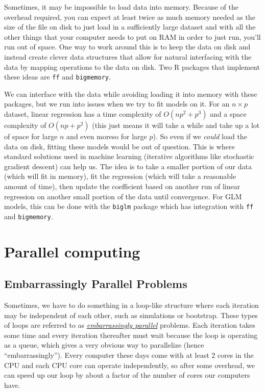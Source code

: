 \documentclass[
]{book}
\begin{document}
Sometimes, it may be impossible to load data into memory. Because of the overhead required, you can expect at least twice as much memory needed as the size of the file on disk to just load in a sufficiently large dataset and with all the other things that your computer needs to put on RAM in order to just run, you'll run out of space. One way to work around this is to keep the data on disk and instead create clever data structures that allow for natural interfacing with the data by mapping operations to the data on disk. Two R packages that implement these ideas are \texttt{ff} and \texttt{bigmemory}.

We can interface with the data while avoiding loading it into memory with these packages, but we run into issues when we try to fit models on it. For an \(n \times p\) dataset, linear regression has a time complexity of \(O(np^2 + p^3)\) and a space complexity of \(O(np + p^2)\) (this just means it will take a while and take up a lot of space for large \(n\) and even moreso for large \(p\)). So even if we \emph{could} load the data on disk, fitting these models would be out of question. This is where standard solutions used in machine learning (iterative algorithms like stochastic gradient descent) can help us. The idea is to take a smaller portion of our data (which will fit in memory), fit the regression (which will take a reasonable amount of time), then update the coefficient based on another run of linear regression on another small portion of the data until convergence. For GLM models, this can be done with the \texttt{biglm} package which has integration with \texttt{ff} and \texttt{bigmemory}.

\hypertarget{parallel-computing}{%
\section{Parallel computing}\label{parallel-computing}}

\hypertarget{embarrassingly-parallel-problems}{%
\subsection{Embarrassingly Parallel Problems}\label{embarrassingly-parallel-problems}}

Sometimes, we have to do something in a loop-like structure where each iteration may be independent of each other, such as simulations or bootstrap. These types of loops are referred to as \href{https://en.wikipedia.org/wiki/Embarrassingly_parallel}{\emph{embarrassingly parallel}} problems. Each iteration takes some time and every iteration thereafter must wait because the loop is operating as a queue, which gives a very obvious way to parallelize (hence ``embarrassingly''). Every computer these days come with at least 2 cores in the CPU and each CPU core can operate independently, so after some overhead, we can speed up our loop by about a factor of the number of cores our computers have.
\end{document}
